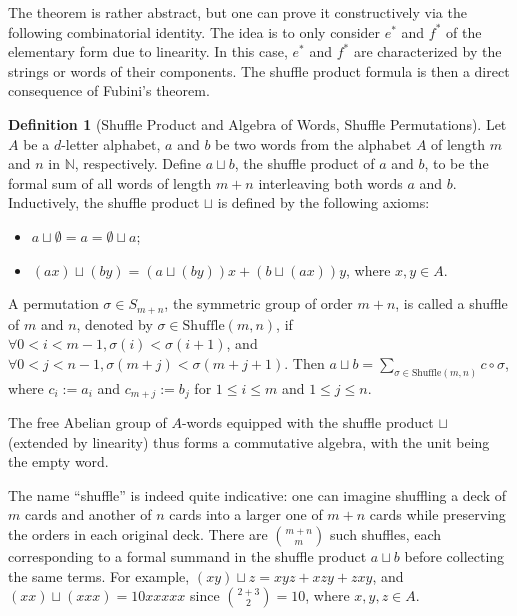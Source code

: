 \documentclass[fleqn]{article}
\theoremstyle{definition}
\newtheorem{defn}[thm]{Definition}
\theoremstyle{remark}
\begin{document}
The theorem is rather abstract, but one can prove it constructively via the following combinatorial identity. The idea is to only consider $e^*$ and $f^*$ of the elementary form due to linearity. In this case, $e^*$ and $f^*$ are characterized by the strings or words of their components. The shuffle product formula is then a direct consequence of Fubini's theorem.
\begin{defn}[Shuffle Product and Algebra of Words, Shuffle Permutations]
Let $A$ be a $d$-letter alphabet, $a$ and $b$ be two words from the alphabet $A$ of length $m$ and $n$ in $\mathbb{N}$, respectively. Define $a\sqcup b$, the shuffle product of $a$ and $b$, to be the formal sum of all words of length $m+n$ interleaving both words $a$ and $b$. Inductively, the shuffle product $\sqcup$ is defined by the following axioms:
\vspace*{-4ex}
\begin{itemize}
\setlength{\itemsep}{-3ex}
    \item $a\sqcup \emptyset = a = \emptyset \sqcup a$;
    \item $(ax) \sqcup (by) = (a\sqcup (by))x + (b\sqcup (ax))y$, where $x,y\in A$.
\end{itemize}
A permutation $\sigma\in S_{m+n}$, the symmetric group of order $m+n$, is called a shuffle of $m$ and $n$, denoted by $\sigma\in \mathrm{Shuffle}(m,n)$, if $\forall 0<i<m-1, \sigma(i)<\sigma(i+1)$, and $\forall 0<j<n-1, \sigma(m+j)<\sigma(m+j+1)$. Then $a\sqcup b = \sum_{\sigma\in \mathrm{Shuffle}(m,n)} c\circ\sigma$, where $c_i:=a_i$ and $c_{m+j}:=b_j$ for $1\le i\le m$ and $1\le j\le n$.
\par
The free Abelian group of $A$-words equipped with the shuffle product $\sqcup$ (extended by linearity) thus forms a commutative algebra, with the unit being the empty word.
\end{defn}

\par
The name ``shuffle'' is indeed quite indicative: one can imagine shuffling a deck of $m$ cards and another of $n$ cards into a larger one of $m+n$ cards while preserving the orders in each original deck. There are $\binom{m+n}{m}$ such shuffles, each corresponding to a formal summand in the shuffle product $a\sqcup b$ before collecting the same terms. For example, $(xy)\sqcup z = xyz + xzy + zxy$, and $(xx)\sqcup (xxx) = 10xxxxx$ since $\binom{2+3}{2}=10$, where $x,y,z\in A$.
\end{document}
